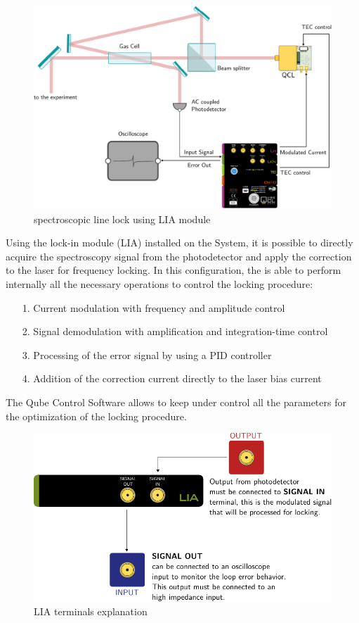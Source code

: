 \begin{figure}[H]
\centering
\includegraphics[width=12cm]{images/LKN_EXPERIMENT_DEMO.pdf}
\caption{spectroscopic line lock using LIA module}
\label{fig:spectroscopic-line-lock}
\end{figure}
\newpage
Using the lock-in module (LIA) installed on the \QubeModel  System, it is possible to directly acquire the spectroscopy signal from the photodetector and apply the correction to the laser for frequency locking.
In this configuration, the \QubeModel  is able to perform internally all the necessary operations to control the locking procedure:
\begin{itemize}
    \item[1.]Current modulation with frequency and amplitude control
    \item[2.]Signal demodulation with amplification and integration-time control
    \item[3.]Processing of the error signal by using a PID controller 
    \item[4.]Addition of the correction current directly to the laser bias current
\end{itemize}


The Qube Control Software allows to keep under control all the parameters for the optimization of the locking procedure.

\begin{figure}[H]
\centering
\includegraphics[width=12cm]{images/LIA_INPUT_EXPLANATION.pdf}
\caption{LIA terminals explanation}
\end{figure}




